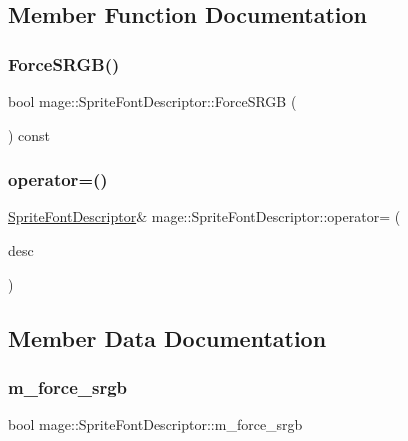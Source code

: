 \subsection{Member Function Documentation}
\hypertarget{structmage_1_1_sprite_font_descriptor_a255defd4a4d706c37a755c0144c2a927}{}\label{structmage_1_1_sprite_font_descriptor_a255defd4a4d706c37a755c0144c2a927} 
\subsubsection{\texorpdfstring{Force\+S\+R\+G\+B()}{ForceSRGB()}}
{\footnotesize\ttfamily bool mage\+::\+Sprite\+Font\+Descriptor\+::\+Force\+S\+R\+GB (\begin{DoxyParamCaption}{ }\end{DoxyParamCaption}) const}

\hypertarget{structmage_1_1_sprite_font_descriptor_a2279d65420bd8230a334c4ceb560fcf6}{}\label{structmage_1_1_sprite_font_descriptor_a2279d65420bd8230a334c4ceb560fcf6} 
\subsubsection{\texorpdfstring{operator=()}{operator=()}}
{\footnotesize\ttfamily \hyperlink{structmage_1_1_sprite_font_descriptor}{Sprite\+Font\+Descriptor}\& mage\+::\+Sprite\+Font\+Descriptor\+::operator= (\begin{DoxyParamCaption}\item[{const \hyperlink{structmage_1_1_sprite_font_descriptor}{Sprite\+Font\+Descriptor} \&}]{desc }\end{DoxyParamCaption})\hspace{0.3cm}{\ttfamily [default]}}



\subsection{Member Data Documentation}
\hypertarget{structmage_1_1_sprite_font_descriptor_a7fa7230004e671127856e2ab1c27c94a}{}\label{structmage_1_1_sprite_font_descriptor_a7fa7230004e671127856e2ab1c27c94a} 
\subsubsection{\texorpdfstring{m\+\_\+force\+\_\+srgb}{m\_force\_srgb}}
{\footnotesize\ttfamily bool mage\+::\+Sprite\+Font\+Descriptor\+::m\+\_\+force\+\_\+srgb\hspace{0.3cm}{\ttfamily [private]}}

